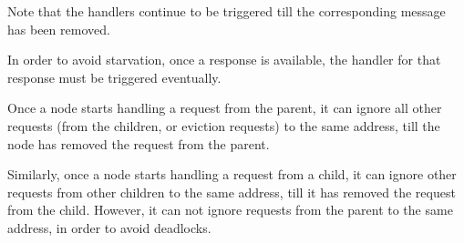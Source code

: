 
Note that the handlers continue to be triggered till the corresponding message
has been removed.

In order to avoid starvation, once a response is available, the handler for that
response must be triggered eventually.

Once a node starts handling a request from the parent, it can ignore all other
requests (from the children, or eviction requests) to the same address, till the
node has removed the request from the parent.

Similarly, once a node starts handling a request from a child, it can ignore
other requests from other children to the same address, till it has removed the
request from the child. However, it can not ignore requests from the parent to
the same address, in order to avoid deadlocks.

